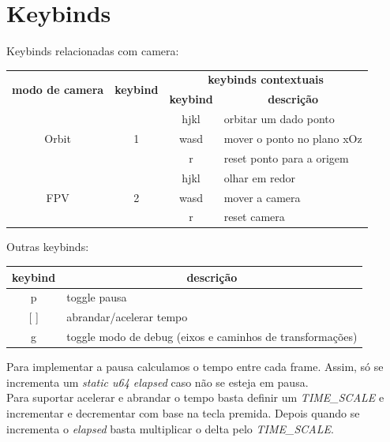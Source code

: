 \documentclass[a4paper]{report}
\begin{document}
\section{Keybinds}
Keybinds relacionadas com camera:
\begin{table}[H]
\begin{tabular}{|c|c|c|l|}
\hline
\multirow{2}{*}{\textbf{modo de camera}} & \multirow{2}{*}{\textbf{keybind}} & \multicolumn{2}{c|}{\textbf{keybinds contextuais}} \\ \cline{3-4} 
                       &                    & \textbf{keybind} & \multicolumn{1}{c|}{\textbf{descrição}} \\ \hline
\multirow{3}{*}{Orbit} & \multirow{3}{*}{1} & hjkl             & orbitar um dado ponto                   \\ \cline{3-4} 
                       &                    & wasd             & mover o ponto no plano xOz              \\ \cline{3-4} 
                       &                    & r                & reset ponto para a origem               \\ \hline
\multirow{3}{*}{FPV}   & \multirow{3}{*}{2} & hjkl             & olhar em redor                          \\ \cline{3-4} 
                       &                    & wasd             & mover a camera                          \\ \cline{3-4} 
                       &                    & r                & reset camera                            \\ \hline
\end{tabular}
\end{table}
Outras keybinds:

\begin{table}[H]
\begin{tabular}{|c|l|}
\hline
\textbf{keybind} & \multicolumn{1}{c|}{\textbf{descrição}}                   \\ \hline
p                & toggle pausa                                              \\ \hline
{[} {]}          & abrandar/acelerar tempo                                   \\ \hline
g                & toggle modo de debug (eixos e caminhos de transformações) \\ \hline
\end{tabular}
\end{table}
Para implementar a pausa calculamos o tempo entre cada frame. Assim, só se
incrementa um \textit{static u64 elapsed} caso não se esteja em pausa.\\
Para suportar acelerar e abrandar o tempo basta definir um \textit{TIME\_SCALE}
e incrementar e decrementar com base na tecla premida. Depois quando se
incrementa o \textit{elapsed} basta multiplicar o delta pelo
\textit{TIME\_SCALE}.\\
\end{document}
